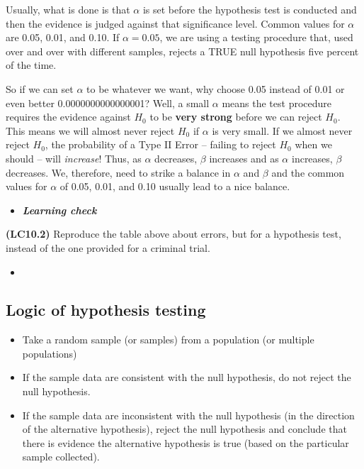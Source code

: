 \documentclass[12pt,]{krantz}
\providecommand{\tightlist}{%
  \setlength{\itemsep}{0pt}\setlength{\parskip}{0pt}}
\newenvironment{rmdblock}[1]
  {\begin{shaded*}
  \begin{itemize}
  \renewcommand{\labelitemi}{
    \raisebox{-.7\height}[0pt][0pt]{
    }
  }
  \item
  }
  {
  \end{itemize}
  \end{shaded*}
  }
\newenvironment{learncheck}
  {\begin{rmdblock}{warning}}
  {\end{rmdblock}}
\theoremstyle{definition}
\theoremstyle{definition}
\theoremstyle{definition}
\theoremstyle{remark}
\begin{document}
Usually, what is done is that \(\alpha\) is set before the hypothesis
test is conducted and then the evidence is judged against that
significance level. Common values for \(\alpha\) are 0.05, 0.01, and
0.10. If \(\alpha = 0.05\), we are using a testing procedure that, used
over and over with different samples, rejects a TRUE null hypothesis
five percent of the time.

So if we can set \(\alpha\) to be whatever we want, why choose 0.05
instead of 0.01 or even better 0.0000000000000001? Well, a small
\(\alpha\) means the test procedure requires the evidence against
\(H_0\) to be \textbf{very strong} before we can reject \(H_0\). This
means we will almost never reject \(H_0\) if \(\alpha\) is very small.
If we almost never reject \(H_0\), the probability of a Type II Error --
failing to reject \(H_0\) when we should -- will \emph{increase}! Thus,
as \(\alpha\) decreases, \(\beta\) increases and as \(\alpha\)
increases, \(\beta\) decreases. We, therefore, need to strike a balance
in \(\alpha\) and \(\beta\) and the common values for \(\alpha\) of
0.05, 0.01, and 0.10 usually lead to a nice balance.

\begin{learncheck}
\textbf{\emph{Learning check}}
\end{learncheck}

\textbf{(LC10.2)} Reproduce the table above about errors, but for a
hypothesis test, instead of the one provided for a criminal trial.

\begin{learncheck}

\end{learncheck}

\subsection{Logic of hypothesis
testing}\label{logic-of-hypothesis-testing}

\begin{itemize}
\tightlist
\item
  Take a random sample (or samples) from a population (or multiple
  populations)
\item
  If the sample data are consistent with the null hypothesis, do not
  reject the null hypothesis.
\item
  If the sample data are inconsistent with the null hypothesis (in the
  direction of the alternative hypothesis), reject the null hypothesis
  and conclude that there is evidence the alternative hypothesis is true
  (based on the particular sample collected).
\end{itemize}
\end{document}
